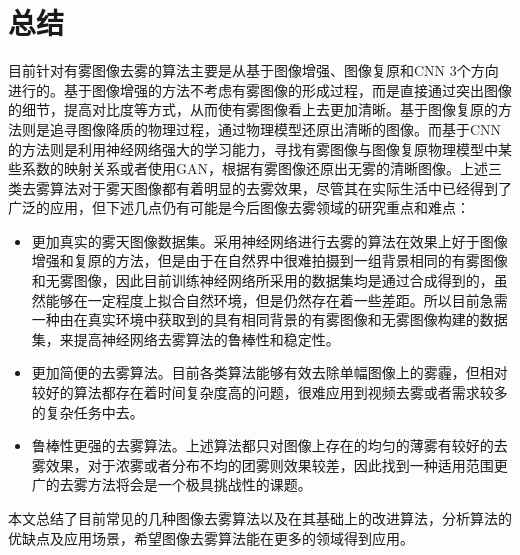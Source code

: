 \documentclass[12pt]{article}
\begin{document}
\section{总结}
目前针对有雾图像去雾的算法主要是从基于图像增强、图像复原和CNN 3个方向进行的。基于图像增强的方法不考虑有雾图像的形成过程，而是直接通过突出图像的细节，提高对比度等方式，从而使有雾图像看上去更加清晰。基于图像复原的方法则是追寻图像降质的物理过程，通过物理模型还原出清晰的图像。而基于CNN的方法则是利用神经网络强大的学习能力，寻找有雾图像与图像复原物理模型中某些系数的映射关系或者使用GAN，根据有雾图像还原出无雾的清晰图像。上述三类去雾算法对于雾天图像都有着明显的去雾效果，尽管其在实际生活中已经得到了广泛的应用，但下述几点仍有可能是今后图像去雾领域的研究重点和难点：
\begin{itemize}
    \item 更加真实的雾天图像数据集。采用神经网络进行去雾的算法在效果上好于图像增强和复原的方法，但是由于在自然界中很难拍摄到一组背景相同的有雾图像和无雾图像，因此目前训练神经网络所采用的数据集均是通过合成得到的，虽然能够在一定程度上拟合自然环境，但是仍然存在着一些差距。所以目前急需一种由在真实环境中获取到的具有相同背景的有雾图像和无雾图像构建的数据集，来提高神经网络去雾算法的鲁棒性和稳定性。
    \item 更加简便的去雾算法。目前各类算法能够有效去除单幅图像上的雾霾，但相对较好的算法都存在着时间复杂度高的问题，很难应用到视频去雾或者需求较多的复杂任务中去。
    \item 鲁棒性更强的去雾算法。上述算法都只对图像上存在的均匀的薄雾有较好的去雾效果，对于浓雾或者分布不均的团雾则效果较差，因此找到一种适用范围更广的去雾方法将会是一个极具挑战性的课题。
\end{itemize}

本文总结了目前常见的几种图像去雾算法以及在其基础上的改进算法，分析算法的优缺点及应用场景，希望图像去雾算法能在更多的领域得到应用。
\end{document}
